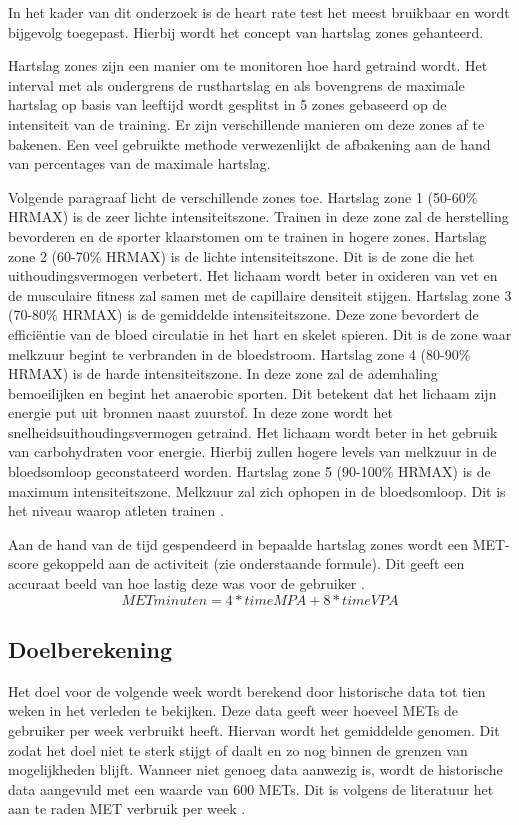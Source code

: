 In het kader van dit onderzoek is de heart rate test het meest bruikbaar en wordt bijgevolg toegepast. Hierbij wordt het concept van hartslag zones gehanteerd.

Hartslag zones zijn een manier om te monitoren hoe hard getraind wordt. Het interval met als ondergrens de rusthartslag en als bovengrens de maximale hartslag op basis van leeftijd wordt gesplitst in 5 zones gebaseerd op de intensiteit van de training. Er zijn verschillende manieren om deze zones af te bakenen. Een veel gebruikte methode verwezenlijkt de afbakening aan de hand van percentages van de maximale hartslag. 

Volgende paragraaf licht de verschillende zones toe.
Hartslag zone 1 (50-60\% HRMAX) is de zeer lichte intensiteitszone. Trainen in deze zone zal de herstelling bevorderen en de sporter klaarstomen om te trainen in hogere zones. 
Hartslag zone 2 (60-70\% HRMAX) is de lichte intensiteitszone. Dit is de zone die het uithoudingsvermogen verbetert. Het lichaam wordt beter in oxideren van vet en de musculaire fitness zal samen met de capillaire densiteit stijgen. 
Hartslag zone 3 (70-80\% HRMAX) is de gemiddelde intensiteitszone. Deze zone bevordert de efficiëntie van de bloed circulatie in het hart en skelet spieren. Dit is de zone waar melkzuur begint te verbranden in de bloedstroom. 
Hartslag zone 4 (80-90\% HRMAX) is de harde intensiteitszone. In deze zone zal de ademhaling bemoeilijken en begint het anaerobic sporten. Dit betekent dat het lichaam zijn energie put uit bronnen naast zuurstof. In deze zone wordt het snelheidsuithoudingsvermogen getraind. Het lichaam wordt beter in het gebruik van carbohydraten voor energie. Hierbij zullen hogere levels van melkzuur in de bloedsomloop geconstateerd worden. 
Hartslag zone 5 (90-100\% HRMAX) is de maximum intensiteitszone. Melkzuur zal zich ophopen in de bloedsomloop. Dit is het niveau waarop atleten trainen \cite{ref72}.

Aan de hand van de tijd gespendeerd in bepaalde hartslag zones wordt een MET-score gekoppeld aan de activiteit (zie onderstaande formule). Dit geeft een accuraat beeld van hoe lastig deze was voor de gebruiker \cite{ref21}.
\[METminuten = 4*timeMPA + 8*timeVPA\]

\subsection{Doelberekening}
Het doel voor de volgende week wordt berekend door historische data tot tien weken in het verleden te bekijken. Deze data geeft weer hoeveel METs de gebruiker per week verbruikt heeft. Hiervan wordt het gemiddelde genomen. Dit zodat het doel niet te sterk stijgt of daalt en zo nog binnen de grenzen van mogelijkheden blijft. Wanneer niet genoeg data aanwezig is, wordt de historische data aangevuld met een waarde van 600 METs. Dit is volgens de literatuur het aan te raden MET verbruik per week \cite{ref21}.

